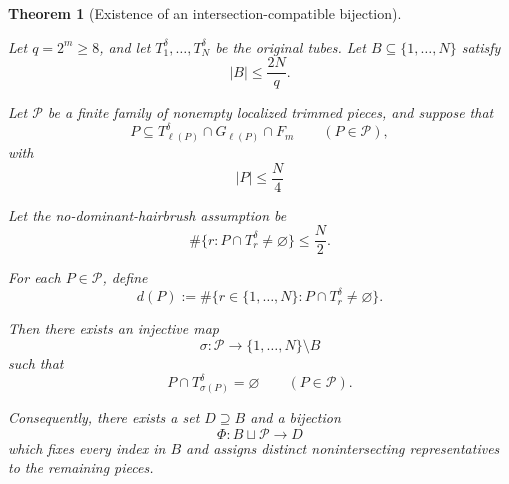 \documentclass[11pt, letterpaper]{nyjm}
\newtheorem{theorem}{Theorem}[section]
\begin{document}
	\begin{theorem}[Existence of an intersection-compatible bijection]
		\label{thm:restricted-bijection}
		
		
		Let $q=2^m\ge 8$, and let
		$T_1^\delta,\ldots,T_N^\delta$ be the original tubes.
		Let $B\subseteq\{1,\ldots,N\}$ satisfy
		\[
		|B|\le \frac{2N}{q}.
		\]
		
		Let $\mathcal P$ be a finite family of nonempty
		localized trimmed pieces, 
		and suppose that
		\[
		P\subseteq T_{\ell(P)}^\delta
		\cap G_{\ell(P)}\cap F_m
		\qquad(P\in\mathcal P),
		\]
		with 
		\[
		|P| \leq \frac N4
		\]
		
		Let the no-dominant-hairbrush assumption be
		\[
		\#\{r:P\cap T_r^\delta\ne\varnothing\}
		\le \frac N2.
		\]
		
		For each $P\in\mathcal P$, define
		\[
		d(P):=
		\#\{r\in\{1,\ldots,N\}:
		P\cap T_r^\delta\ne\varnothing\}.
		\]

		
		Then there exists an injective map
		\[
		\sigma:\mathcal P\longrightarrow
		\{1,\ldots,N\}\setminus B
		\]
		such that
		\[
		P\cap T_{\sigma(P)}^\delta=\varnothing
		\qquad(P\in\mathcal P).
		\]
		
		Consequently, there exists a set
		$D\supseteq B$ and a bijection
		\[
		\Phi:B\sqcup\mathcal P\longrightarrow D
		\]
		which fixes every index in $B$ and assigns
		distinct nonintersecting representatives
		to the remaining pieces.
		
	\end{theorem}
	
\end{document}
